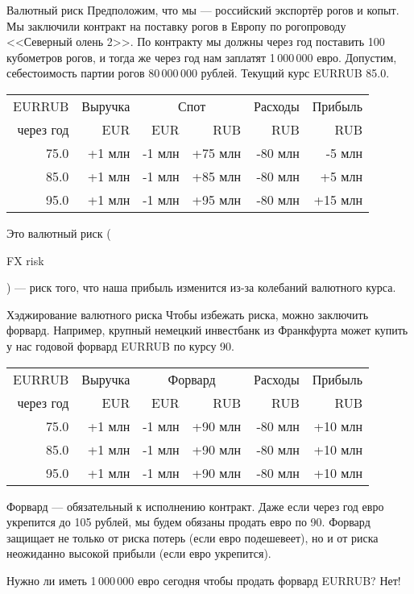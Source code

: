 \documentclass{beamer}
\newcommand{\en}[1]{\begin{otherlanguage}{english}#1\end{otherlanguage}}
\begin{document}
\begin{frame}{Валютный риск}
\justify
Предположим, что мы --- российский экспортёр рогов и копыт. Мы заключили контракт на поставку рогов в Европу по рогопроводу <<Северный олень 2>>. По контракту мы должны через год поставить 100 кубометров рогов, и тогда же через год нам заплатят 1\,000\,000 евро. Допустим, себестоимость партии рогов 80\,000\,000 рублей. Текущий курс EURRUB 85.0.

\justify
\centering
\begin{tabular}{r|r|r|r|r|r}
EURRUB      & Выручка & \multicolumn{2}{c|}{Спот} & Расходы & Прибыль \\
\cline{3-4}
через год   & EUR     & EUR    & RUB              & RUB     & RUB   \\ \hline
75.0        & +1 млн  & -1 млн & +75 млн          & -80 млн & -5 млн \\
85.0        & +1 млн  & -1 млн & +85 млн          & -80 млн & +5 млн \\
95.0        & +1 млн  & -1 млн & +95 млн          & -80 млн & +15 млн
\end{tabular}

\justify
Это валютный риск (\en{FX risk}) --- риск того, что наша прибыль изменится из-за колебаний валютного курса.
\end{frame}



\begin{frame}{Хэджирование валютного риска}
\justify
Чтобы избежать риска, можно заключить форвард. Например, крупный немецкий инвестбанк из 
Франкфурта может купить у нас годовой форвард EURRUB по курсу 90.

\justify
\centering
\begin{tabular}{r|r|r|r|r|r}
EURRUB      & Выручка & \multicolumn{2}{c|}{Форвард} & Расходы & Прибыль \\
\cline{3-4}
через год   & EUR     & EUR    & RUB              & RUB     & RUB   \\ \hline
75.0        & +1 млн  & -1 млн & +90 млн          & -80 млн & +10 млн \\
85.0        & +1 млн  & -1 млн & +90 млн          & -80 млн & +10 млн \\
95.0        & +1 млн  & -1 млн & +90 млн          & -80 млн & +10 млн
\end{tabular}

\justify
Форвард --- обязательный к исполнению контракт. Даже если через год евро укрепится до 
105 рублей, мы будем обязаны продать евро по 90. Форвард защищает не только от риска 
потерь (если евро подешевеет), но и от риска неожиданно высокой прибыли (если евро 
укрепится).

\justify
Нужно ли иметь 1\,000\,000 евро сегодня чтобы продать форвард EURRUB? Нет!
\end{frame}
\end{document}
